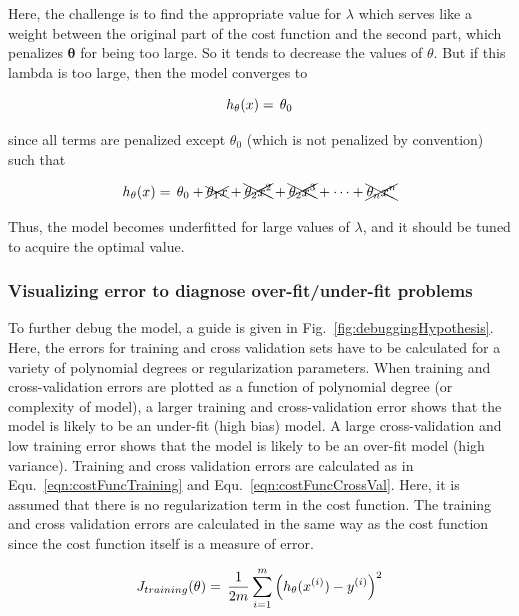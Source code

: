 Here, the challenge is to find the appropriate value for $\lambda$ which serves like a weight between the original part of the cost function and the second part, which penalizes $\bm{\theta}$ for being too large. 
So it tends to decrease the values of $\theta$. But if this lambda is too large, then the model converges to  

\begin{equation}{\label{eqn:costFuncRegularizedTooMuch}}
h_\theta(x)
=\,
\theta_0 
\end{equation} 

since all terms are penalized except $\theta_0$ (which is not penalized by convention) such that

\begin{equation}{\label{eqn:costFuncRegularizedTooMuchHow}}
h_\theta(x)
=\,
\theta_0 + \xcancel{\theta_1 x}  + \xcancel{\theta_2 x^2}  + \xcancel{\theta_2 x^3}  + \cdots + \xcancel{\theta_n x^n}
\end{equation} 

Thus, the model becomes underfitted for large values of $\lambda$, and it should be tuned to acquire the optimal value.


\subsubsection{Visualizing error to diagnose over-fit/under-fit problems}

To further debug the model, a guide is given in Fig.~\ref{fig:debuggingHypothesis}. 
Here, the errors for training and cross validation sets have to be calculated for a variety of polynomial degrees or regularization parameters. 
When training and cross-validation errors are plotted as a function of polynomial degree (or complexity of model), a larger training and cross-validation error shows that the model is likely to be an under-fit (high bias) model.  %
A large cross-validation and low training error shows that the model is likely to be an over-fit model (high variance). 
Training and cross validation errors are calculated as in Equ.~\ref{eqn:costFuncTraining} and Equ.~\ref{eqn:costFuncCrossVal}. 
Here, it is assumed that there is no regularization term in the cost function. 
The training and cross validation errors are calculated in the same way as the cost function since the cost function itself is a measure of error.


\iffalse
\begin{equation}{\label{eqn:trainingError}}
J_{training}(\theta)
=\,
\frac{1}{2m} \sum\limits_{i=1}^{m} \Big(h_\theta(x^{(i)}) - y^{(i)}\Big)^2  
\end{equation} 

